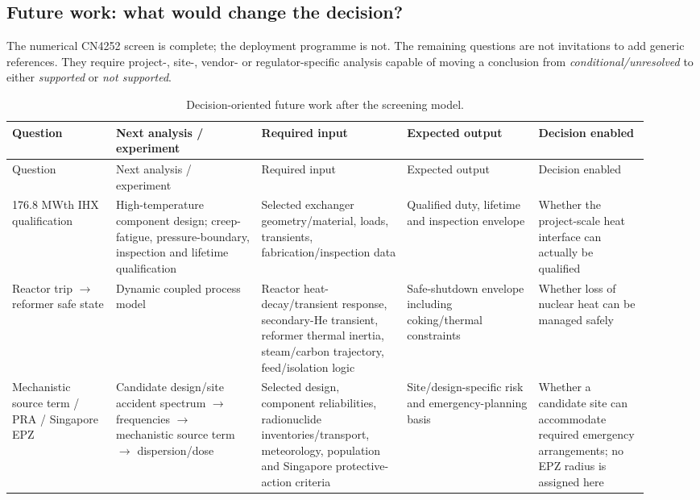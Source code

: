 \subsection{Future work: what would change the decision?}
\label{sec:future-work}

The numerical CN4252 screen is complete; the deployment programme is not.  The remaining questions are not invitations to add generic references.  They require project-, site-, vendor- or regulator-specific analysis capable of moving a conclusion from \emph{conditional/unresolved} to either \emph{supported} or \emph{not supported}.

\begingroup
\footnotesize
\setlength{\tabcolsep}{3pt}
\renewcommand{\arraystretch}{1.12}
\begin{longtable}{p{0.15\linewidth}p{0.21\linewidth}p{0.21\linewidth}p{0.19\linewidth}p{0.16\linewidth}}
\caption{Decision-oriented future work after the screening model.}\label{tab:future-work}\\
\toprule
Question & Next analysis / experiment & Required input & Expected output & Decision enabled\\ \midrule
\endfirsthead
\toprule
Question & Next analysis / experiment & Required input & Expected output & Decision enabled\\ \midrule
\endhead
176.8 MWth IHX qualification &
High-temperature component design; creep-fatigue, pressure-boundary, inspection and lifetime qualification &
Selected exchanger geometry/material, loads, transients, fabrication/inspection data &
Qualified duty, lifetime and inspection envelope &
Whether the project-scale heat interface can actually be qualified\\

Reactor trip $\rightarrow$ reformer safe state &
Dynamic coupled process model &
Reactor heat-decay/transient response, secondary-He transient, reformer thermal inertia, steam/carbon trajectory, feed/isolation logic &
Safe-shutdown envelope including coking/thermal constraints &
Whether loss of nuclear heat can be managed safely\\

Mechanistic source term / PRA / Singapore EPZ &
Candidate design/site accident spectrum $\rightarrow$ frequencies $\rightarrow$ mechanistic source term $\rightarrow$ dispersion/dose &
Selected design, component reliabilities, radionuclide inventories/transport, meteorology, population and Singapore protective-action criteria &
Site/design-specific risk and emergency-planning basis &
Whether a candidate site can accommodate required emergency arrangements; no EPZ radius is assigned here\\


\end{longtable}
